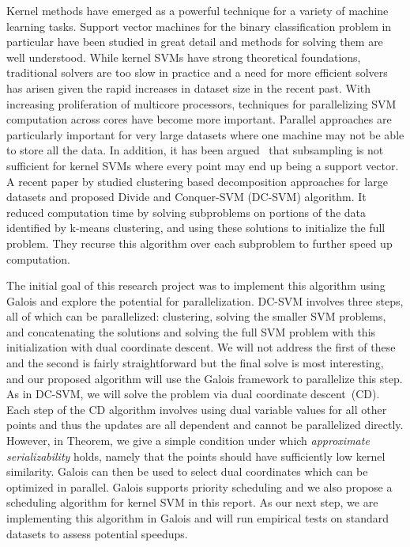 Kernel methods have emerged as a powerful technique for a variety of machine learning tasks. 
Support vector machines for the binary classification problem in particular have been studied in great detail and methods for solving them are well understood. 
While kernel SVMs have strong theoretical foundations, traditional solvers are too slow in practice and a need for more efficient solvers has arisen given the rapid increases in dataset size in the recent past. With increasing proliferation of multicore processors, techniques for parallelizing SVM computation across cores have become more important. Parallel approaches are particularly important for very large datasets where one machine may not be able to store all the data. In addition, it has been argued~\cite{brugger2006parallel} that subsampling is not sufficient for kernel SVMs where every point may end up being a support vector. A recent paper by \cite{hsieh2013divide} studied clustering based decomposition approaches for large datasets and proposed Divide and Conquer-SVM (DC-SVM) algorithm. It reduced computation time by solving subproblems on portions of the data identified by k-means clustering, and using these solutions to initialize the full problem. They recurse this algorithm over each subproblem to further speed up computation. 

The initial goal of this research project was to implement this algorithm using Galois and explore the potential for parallelization. 
DC-SVM involves three steps, all of which can be parallelized: clustering, solving the smaller SVM problems, and concatenating the solutions and solving the full SVM problem with this initialization with dual coordinate descent. 
We will not address the first of these and the second is fairly straightforward but the final solve is most interesting, and our proposed algorithm will use the Galois framework to parallelize this step. As in DC-SVM, we will solve the problem via dual coordinate descent~(CD). Each step of the CD algorithm involves using dual variable values for all other points and thus the updates are all dependent and cannot be parallelized directly. However, in Theorem, we give a simple condition under which \emph{approximate serializability} holds, namely that the points should have sufficiently low kernel similarity. Galois can then be used to select dual coordinates which can be optimized in parallel. Galois supports priority scheduling and we also propose a scheduling algorithm for kernel SVM in this report. As our next step, we are implementing this algorithm in Galois and will run empirical tests on standard datasets to assess potential speedups.

